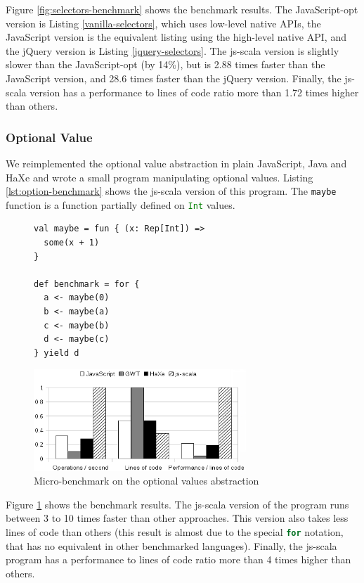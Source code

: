 \documentclass{llncs}
\newcommand{\code}[1]{\lstinline[language=Scala,columns=fixed,basicstyle=\footnotesize]|#1|}
\begin{document}
Figure \ref{fig:selectors-benchmark} shows the benchmark results. The JavaScript-opt version is
Listing \ref{vanilla-selectors}, which uses low-level native APIs, the JavaScript version is the
equivalent listing using the high-level native API, and the jQuery version is Listing
\ref{jquery-selectors}. The js-scala version is slightly slower than the JavaScript-opt (by 14\%),
but is 2.88 times faster than the JavaScript version, and 28.6 times faster than the jQuery
version. Finally, the js-scala version has a performance to lines of code ratio more than 1.72
times higher than others.

\subsubsection{Optional Value}

We reimplemented the optional value abstraction in plain JavaScript, Java and HaXe and wrote a small
program manipulating optional values. Listing \ref{lst:option-benchmark} shows the js-scala
version of this program. The \code{maybe} function is a function partially defined on
\code{Int} values.

\begin{figure}
\begin{lstlisting}[label=lst:option-benchmark,caption=Micro-benchmark code for the optional values
abstraction]
val maybe = fun { (x: Rep[Int]) =>
  some(x + 1)
}

def benchmark = for {
  a <- maybe(0)
  b <- maybe(a)
  c <- maybe(b)
  d <- maybe(c)
} yield d
\end{lstlisting}
\end{figure}


\begin{figure}
\centering
\includegraphics[width=8cm]{gpce19c-foy-microbenchmark.png}
\caption{Micro-benchmark on the optional values abstraction}
\label{micro-benchmark}
\end{figure}

Figure \ref{micro-benchmark} shows the benchmark results. The js-scala version of the program runs
between 3 to 10 times faster than other approaches. This version also takes less lines of code than
others (this result is almost due to the special \code{for} notation, that has no equivalent in
other benchmarked languages). Finally, the js-scala program has a performance to lines of code ratio
more than 4 times higher than others.
\end{document}
